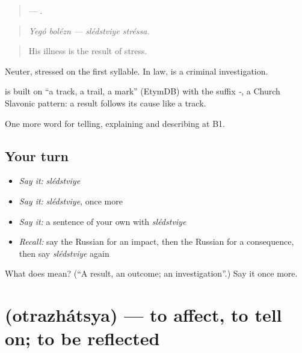 \begin{quote}
  —  .
\end{quote}

\begin{quote}
\emph{Yegó bolézn — slédstviye stréssa.}
\end{quote}

\begin{quote}
His illness is the result of stress.
\end{quote}

Neuter, stressed on the first syllable. In law, \emph{} is a criminal investigation.

\begin{cousinweb}
\textbf{} is built on \emph{} \textquotedblleft{}a track, a trail, a mark\textquotedblright{} (EtymDB) with the suffix \emph{-}, a Church Slavonic pattern: a result follows its cause like a track.
\end{cousinweb}

\begin{grammarlens}[title={What you've built}]
One more word for telling, explaining and describing at B1.
\end{grammarlens}

\subsection*{Your turn}
\begin{itemize}
\raggedright
  \item \emph{Say it:} \emph{slédstviye}
  \item \emph{Say it:} \emph{slédstviye}, once more
  \item \emph{Say it:} a sentence of your own with \emph{slédstviye}
  \item \emph{Recall:} say the Russian for an impact, then the Russian for a consequence, then say \emph{slédstviye} again
\end{itemize}

\begin{tcolorbox}[breakable,colback=teal!4,colframe=teal!35!black,title={Before you move on}]
What does  mean? (\textquotedblleft{}A result, an outcome; an investigation\textquotedblright{}.) Say it once more.
\end{tcolorbox}
\section[\texorpdfstring{\ru{отражаться} (otrazhátsya)}{отражаться (otrazhátsya)}]{ (otrazhátsya) — to affect, to tell on; to be reflected}

